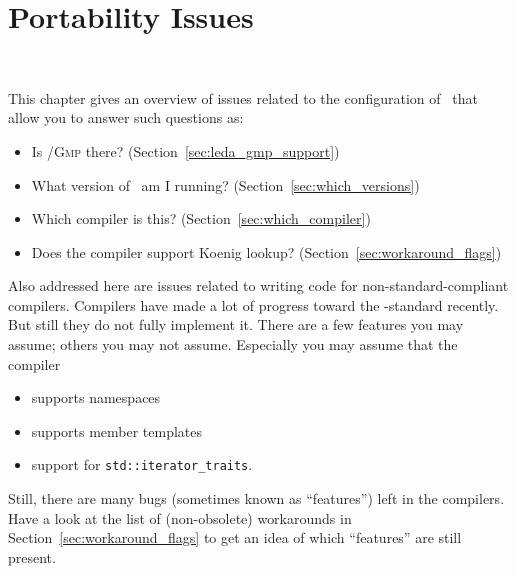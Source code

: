 
\chapter{Portability Issues}
\label{chap:portability}
 \\

This chapter gives an overview of issues related to the
configuration of \cgal\ that allow you to answer such questions as:
\begin{itemize}
\item Is \leda/\textsc{Gmp} there? (Section~\ref{sec:leda_gmp_support})
\item What version of \cgal\ am I running? (Section~\ref{sec:which_versions})
\item Which compiler is this? (Section~\ref{sec:which_compiler})
\item Does the compiler support Koenig lookup? (Section~\ref{sec:workaround_flags})
\end{itemize}

Also addressed here are issues related to writing code for 
non-standard-compliant compilers.  Compilers have made a lot of progress toward 
the \CC-standard recently.  But still they do not fully implement it. There 
are a few features you may assume; others you may not
assume. Especially you may assume that the compiler
\begin{itemize}
\item supports namespaces
\item supports member templates
\item support for \texttt{std::iterator\_traits}.
\end{itemize}
Still, there are many bugs (sometimes known as ``features'') left in the 
compilers.  Have a look at the list of (non-obsolete) workarounds in 
Section~\ref{sec:workaround_flags} to get an idea of which ``features'' are
still present.  

